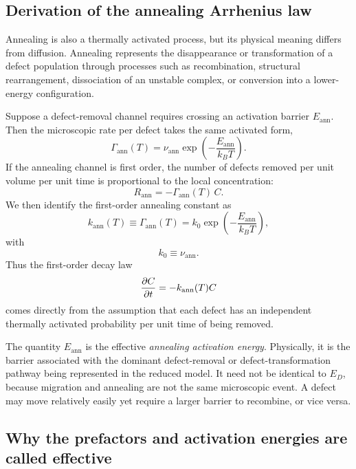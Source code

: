 \documentclass[11pt]{article}
\begin{document}
\subsection{Derivation of the annealing Arrhenius law}

Annealing is also a thermally activated process, but its physical meaning differs from diffusion. Annealing represents the disappearance or transformation of a defect population through processes such as recombination, structural rearrangement, dissociation of an unstable complex, or conversion into a lower-energy configuration.

Suppose a defect-removal channel requires crossing an activation barrier $E_{\mathrm{ann}}$. Then the microscopic rate per defect takes the same activated form,
\begin{equation}
\Gamma_{\mathrm{ann}}(T) = \nu_{\mathrm{ann}} \exp\left(-\frac{E_{\mathrm{ann}}}{k_B T}\right).
\end{equation}
If the annealing channel is first order, the number of defects removed per unit volume per unit time is proportional to the local concentration:
\begin{equation}
R_{\mathrm{ann}} = -\Gamma_{\mathrm{ann}}(T) \, C.
\end{equation}
We then identify the first-order annealing constant as
\begin{equation}
k_{\mathrm{ann}}(T) \equiv \Gamma_{\mathrm{ann}}(T) = k_0 \exp\left(-\frac{E_{\mathrm{ann}}}{k_B T}\right),
\end{equation}
with
\begin{equation}
k_0 \equiv \nu_{\mathrm{ann}}.
\end{equation}
Thus the first-order decay law
\begin{equation}
\pdv{C}{t} = -k_{\mathrm{ann}}(T) C
\end{equation}
comes directly from the assumption that each defect has an independent thermally activated probability per unit time of being removed.

The quantity $E_{\mathrm{ann}}$ is the effective \emph{annealing activation energy}. Physically, it is the barrier associated with the dominant defect-removal or defect-transformation pathway being represented in the reduced model. It need not be identical to $E_D$, because migration and annealing are not the same microscopic event. A defect may move relatively easily yet require a larger barrier to recombine, or vice versa.

\subsection{Why the prefactors and activation energies are called effective}
\end{document}
